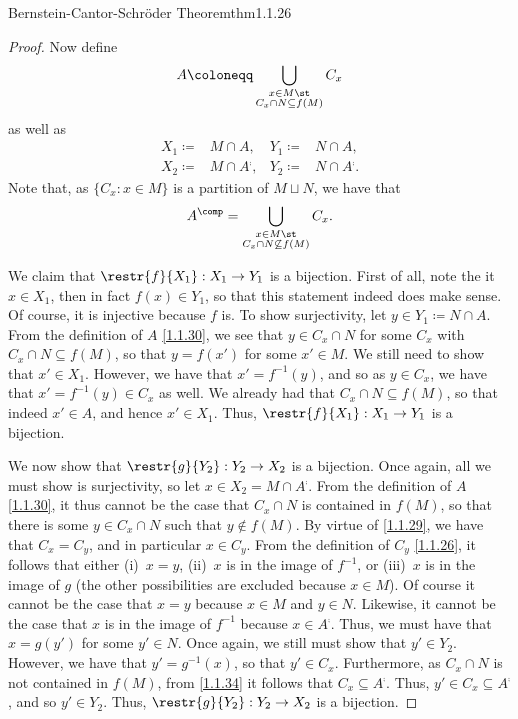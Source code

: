 \begin{thm}{Bernstein-Cantor-Schr\"{o}der Theorem}{thm1.1.26}
\begin{proof}
Now define
\begin{equation}\label{1.1.30}
A\coloneqq \bigcup _{\substack{x\in M\st \\ C_x\cap N\subseteq f(M)}}C_x
\end{equation}
as well as
\begin{subequations}
\begin{align}
X_1\coloneqq&M\cap A, & Y_1\coloneqq&N\cap A, \\
X_2\coloneqq&M\cap A^{\comp}, & Y_2\coloneqq&N\cap A^{\comp}.
\end{align}
\end{subequations}
Note that, as $\{ C_x:x\in M\}$ is a partition of $M\sqcup N$, we have that
\begin{equation}\label{1.1.34}
A^{\comp}=\bigcup _{\substack{x\in M\st \\ C_x\cap N\not \subseteq f(M)}}C_x.
\end{equation}

We claim that $\restr{f}{X_1}:X_1\rightarrow Y_1$ is a bijection.  First of all, note the it $x\in X_1$, then in fact $f(x)\in Y_1$, so that this statement indeed does make sense.  Of course, it is injective because $f$ is.  To show surjectivity, let $y\in Y_1\coloneqq N\cap A$.  From the definition of $A$ \eqref{1.1.30}, we see that $y\in C_x\cap N$ for some $C_x$ with $C_x\cap N\subseteq f(M)$, so that $y=f(x')$ for some $x'\in M$.  We still need to show that $x'\in X_1$.  However, we have that $x'=f^{-1}(y)$, and so as $y\in C_x$, we have that $x'=f^{-1}(y)\in C_x$ as well.  We already had that $C_x\cap N\subseteq f(M)$, so that indeed $x'\in A$, and hence $x'\in X_1$.  Thus, $\restr{f}{X_1}:X_1\rightarrow Y_1$ is a bijection.

We now show that $\restr{g}{Y_2}:Y_2\rightarrow X_2$ is a bijection.  Once again, all we must show is surjectivity, so let $x\in X_2=M\cap A^{\comp}$. From the definition of $A$ \eqref{1.1.30}, it thus cannot be the case that $C_x\cap N$ is contained in $f(M)$, so that there is some $y\in C_x\cap N$ such that $y\notin f(M)$.  By virtue of \eqref{1.1.29}, we have that $C_x=C_y$, and in particular $x\in C_y$.  From the definition of $C_y$ \eqref{1.1.26}, it follows that either (i)~$x=y$, (ii)~$x$ is in the image of $f^{-1}$, or (iii)~$x$ is in the image of $g$ (the other possibilities are excluded because $x\in M$).  Of course it cannot be the case that $x=y$ because $x\in M$ and $y\in N$.  Likewise, it cannot be the case that $x$ is in the image of $f^{-1}$ because $x\in A^{\comp}$.  Thus, we must have that $x=g(y')$ for some $y'\in N$.  Once again, we still must show that $y'\in Y_2$.  However, we have that $y'=g^{-1}(x)$, so that $y'\in C_x$.  Furthermore, as $C_x\cap N$ is not contained in $f(M)$, from \eqref{1.1.34} it follows that $C_x\subseteq A^{\comp}$.  Thus, $y'\in C_x\subseteq A^{\comp}$, and so $y'\in Y_2$.  Thus, $\restr{g}{Y_2}:Y_2\rightarrow X_2$ is a bijection.


\end{proof}
\end{thm}
